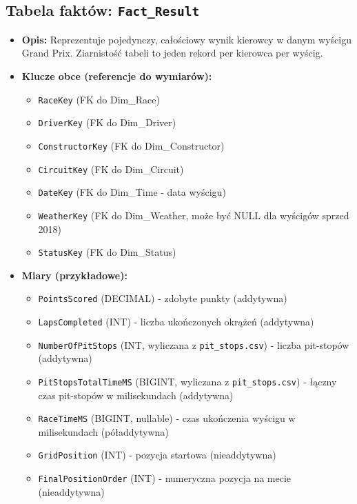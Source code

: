 \documentclass[a4paper,12pt]{article}
\begin{document}
\subsection{Tabela faktów: \texttt{Fact\_Result}}
\begin{itemize}[label=\textbullet, leftmargin=*]
  \item \textbf{Opis:} Reprezentuje pojedynczy, całościowy wynik kierowcy w danym wyścigu Grand Prix. Ziarnistość tabeli to jeden rekord per kierowca per wyścig.
  \item \textbf{Klucze obce (referencje do wymiarów):}
        \begin{itemize}[label=\textendash, leftmargin=1em]
          \item \texttt{RaceKey} (FK do Dim\_Race)
          \item \texttt{DriverKey} (FK do Dim\_Driver)
          \item \texttt{ConstructorKey} (FK do Dim\_Constructor)
          \item \texttt{CircuitKey} (FK do Dim\_Circuit)
          \item \texttt{DateKey} (FK do Dim\_Time - data wyścigu)
          \item \texttt{WeatherKey} (FK do Dim\_Weather, może być NULL dla wyścigów sprzed 2018)
          \item \texttt{StatusKey} (FK do Dim\_Status)
        \end{itemize}
  \item \textbf{Miary (przykładowe):}
        \begin{itemize}[label=\textendash, leftmargin=1em]
          \item \texttt{PointsScored} (DECIMAL) - zdobyte punkty (addytywna)
          \item \texttt{LapsCompleted} (INT) - liczba ukończonych okrążeń (addytywna)
          \item \texttt{NumberOfPitStops} (INT, wyliczana z \texttt{pit\_stops.csv}) - liczba pit-stopów (addytywna)
          \item \texttt{PitStopsTotalTimeMS} (BIGINT, wyliczana z \texttt{pit\_stops.csv}) - łączny czas pit-stopów w milisekundach (addytywna)
          \item \texttt{RaceTimeMS} (BIGINT, nullable) - czas ukończenia wyścigu w milisekundach (póładdytywna)
          \item \texttt{GridPosition} (INT) - pozycja startowa (nieaddytywna)
          \item \texttt{FinalPositionOrder} (INT) - numeryczna pozycja na mecie (nieaddytywna)

\end{itemize}
\end{itemize}
\end{document}
